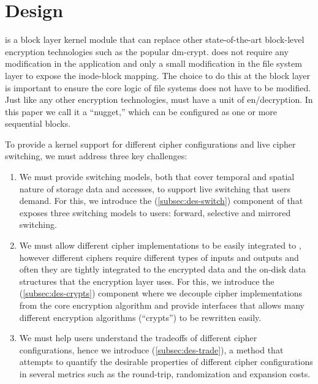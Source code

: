 \section{\sys Design}\label{sec:des}

\sys is a block layer kernel module that can replace other state-of-the-art
block-level encryption technologies such as the popular dm-crypt. \sys does not
require any modification in the application and only a small modification in the
file system layer to expose the inode-block mapping. The choice to do this at
the block layer is important to ensure the core logic of file systems does not
have to be modified. Just like any other encryption technologies, \sys must have
a unit of en/decryption. In this paper we call it a ``nugget,'' which can be
configured as one or more sequential blocks.

To provide a kernel support for different cipher configurations and live cipher
switching, we must address three key challenges:

\begin{enumerate}

\item We must provide switching models, both that cover temporal and spatial
  nature of storage data and accesses, to support live switching that users
  demand. For this, we introduce the \sysA (\cref{subsec:des-switch}) component
  of \sys that exposes three switching models to users: forward, selective and
  mirrored switching.

\item We must allow different cipher implementations to be easily integrated to
  \sys, however different ciphers require different types of inputs and outputs
  and often they are tightly integrated to the encrypted data and the on-disk
  data structures that the encryption layer uses. For this, we introduce the
  \sysB (\cref{subsec:des-crypts}) component where we decouple cipher
  implementations from the core encryption algorithm and provide interfaces that
  allows many different encryption algorithms (``crypts'') to be rewritten
  easily.

\item We must help users understand the tradeoffs of different cipher
  configurations, hence we introduce \sysC (\cref{subsec:des-trade}), a method
  that attempts to quantify the desirable properties of different cipher
  configurations in several metrics such as the round-trip, randomization and
  expansion costs.

\end{enumerate}

